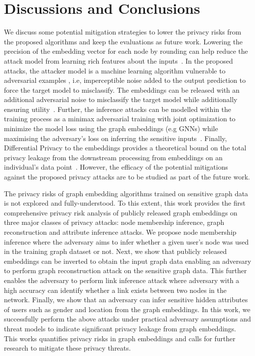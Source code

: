 \section{Discussions and Conclusions}\label{conclusions}

We discuss some potential mitigation strategies to lower the privacy risks from the proposed algorithms and keep the evaluations as future work.
Lowering the precision of the embedding vector for each node by rounding can help reduce the attack model from learning rich features about the inputs~\cite{membershipinf,nlp}.
In the proposed attacks, the attacker model is a machine learning algorithm vulnerable to adversarial examples , i.e, imperceptible noise added to the output prediction to force the target model to misclassify.
The embeddings can be released with an additional adversarial noise to misclassify the target model while additionally ensuring utility~\cite{attriguard,memguard}.
Further, the inference attacks can be modelled within the training process as a minimax adversarial training with joint optimization to minimize the model loss using the graph embeddings (e.g GNNs) while maximising the adversary's loss on inferring the sensitive inputs~\cite{advreg,textembleak}.
Finally, Differential Privacy to the embeddings provides a theoretical bound on the total privacy leakage from the downstream processing from embeddings on an individual's data point~\cite{dptext,dpne}.
However, the efficacy of the potential mitigations against the proposed privacy attacks are to be studied as part of the future work.



The privacy risks of graph embedding algorithms trained on sensitive graph data is not explored and fully-understood.
To this extent, this work provides the first comprehensive privacy risk analysis of publicly released graph embeddings on three major classes of privacy attacks: node membership inference, graph reconstruction and attribute inference attacks.
We propose node membership inference where the adversary aims to infer whether a given user's node was used in the training graph dataset or not.
Next, we show that publicly released embeddings can be inverted to obtain the input graph data enabling an adversary to perform graph reconstruction attack on the sensitive graph data.
This further enables the adversary to perform link inference attack where adversary with a high accuracy can identify whether a link exists between two nodes in the network.
Finally, we show that an adversary can infer sensitive hidden attributes of users such as gender and location from the graph embeddings.
In this work, we successfully perform the above attacks under practical adversary assumptions and threat models to indicate significant privacy leakage from graph embeddings.
This works quantifies privacy risks in graph embeddings and calls for further research to mitigate these privacy threats.

